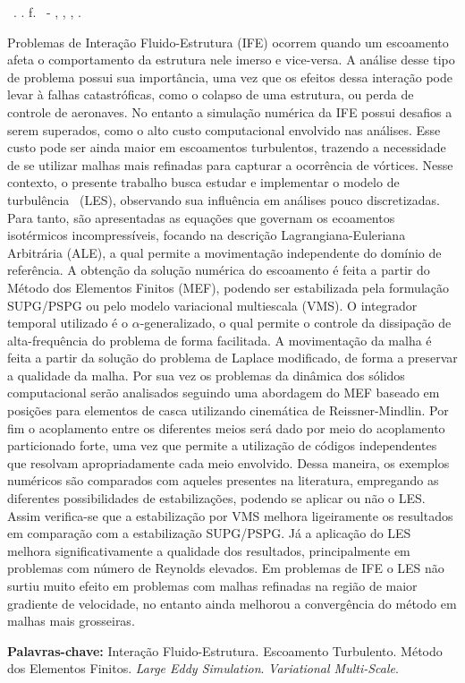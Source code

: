 \setlength{\absparsep}{18pt} %
\begin{resumo}
  \begin{flushleft}
    \setlength{\absparsep}{0pt} %
    \SingleSpacing
    \Autorabr\ \textbf{\Titulo}.	\the\year. \pageref{LastPage}f.
    \Tipotrabalho\ - \Unidademin, \Universidade, \Local, \the\year.
  \end{flushleft}
  \OnehalfSpacing

  Problemas de Interação Fluido-Estrutura (IFE) ocorrem quando um escoamento afeta o comportamento da estrutura nele imerso e vice-versa. A análise desse tipo de problema possui sua importância, uma vez que os efeitos dessa interação pode levar à falhas catastróficas, como o colapso de uma estrutura, ou perda de controle de aeronaves. No entanto a simulação numérica da IFE possui desafios a serem superados, como o alto custo computacional envolvido nas análises. Esse custo pode ser ainda maior em escoamentos turbulentos, trazendo a necessidade de se utilizar malhas mais refinadas para capturar a ocorrência de vórtices. Nesse contexto, o presente trabalho busca estudar e implementar o modelo de turbulência \LES\ (LES), observando sua influência em análises pouco discretizadas. Para tanto, são apresentadas as equações que governam os ecoamentos isotérmicos incompressíveis, focando na descrição Lagrangiana-Euleriana Arbitrária (ALE), a qual permite a movimentação independente do domínio de referência. A obtenção da solução numérica do escoamento é feita a partir do Método dos Elementos Finitos (MEF), podendo ser estabilizada pela formulação SUPG/PSPG ou pelo modelo variacional multiescala (VMS). O integrador temporal utilizado é o $\alpha$-generalizado, o qual permite o controle da dissipação de alta-frequência do problema de forma facilitada. A movimentação da malha é feita a partir da solução do problema de Laplace modificado, de forma a preservar a qualidade da malha. Por sua vez os problemas da dinâmica dos sólidos computacional serão analisados seguindo uma abordagem do MEF baseado em posições para elementos de casca utilizando cinemática de Reissner-Mindlin. Por fim o acoplamento entre os diferentes meios será dado por meio do acoplamento particionado forte, uma vez que permite a utilização de códigos independentes que resolvam apropriadamente cada meio envolvido. Dessa maneira, os exemplos numéricos são comparados com aqueles presentes na literatura, empregando as diferentes possibilidades de estabilizações, podendo se aplicar ou não o LES. Assim verifica-se que a estabilização por VMS melhora ligeiramente os resultados em comparação com a estabilização SUPG/PSPG. Já a aplicação do LES melhora significativamente a qualidade dos resultados, principalmente em problemas com número de Reynolds elevados. Em problemas de IFE o LES não surtiu muito efeito em problemas com malhas refinadas na região de maior gradiente de velocidade, no entanto ainda melhorou a convergência do método em malhas mais grosseiras.

  \textbf{Palavras-chave:} Interação Fluido-Estrutura. Escoamento Turbulento. Método dos Elementos Finitos. \textit{Large Eddy Simulation}. \textit{Variational Multi-Scale}.
\end{resumo}

